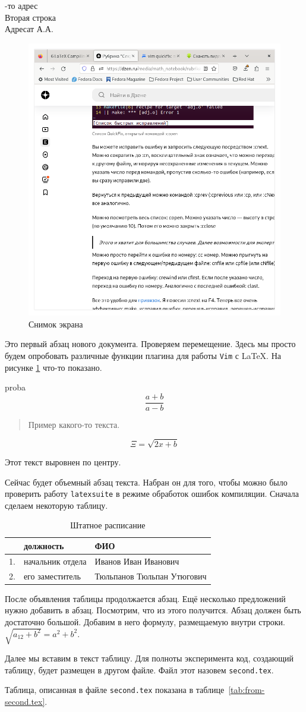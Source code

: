 \documentclass[a4paper]{article}
\begin{document}
\hfill
\parbox{75mm}{-то адрес\\Вторая строка\\[3mm]Адресат А.А.}
	
\begin{figure}[t]
	\centering
	\includegraphics[width=.7\textwidth]{screenshot-firefox.png}
	\caption{Снимок экрана}
	\label{fig:screenshot}
\end{figure}

Это первый абзац нового документа. Проверяем перемещение. Здесь мы просто будем опробовать различные функции 
плагина для работы \texttt{Vim} с \LaTeX.
На рисунке \ref{fig:screenshot} что-то показано. 

proba 
$$\frac{a+b}{a-b}$$
\begin{quote}
  Пример какого-то текста.
\end{quote}
\begin{equation}
   \Xi = \sqrt{2x+b} 
  \label{equation}
\end{equation}
\begin{center}
	Этот текст выровнен по центру.
\end{center}
Сейчас будет объемный абзац текста. Набран он для того, чтобы можно было проверить работу
\texttt{latexsuite} в режиме обработок ошибок компиляции. Сначала сделаем некоторую таблицу.
\begin{table}
	\centering
	\begin{tabular}{|c|l|p{3cm}|}
		\hline
		\textnumero&должность&ФИО\\
		\hline
		1.&начальник отдела&Иванов Иван Иванович\\
		2.&его заместитель&Тюльпанов Тюльпан Утюгович\\
		\hline
	\end{tabular}
	\caption{Штатное расписание}
	\label{tab:state-department}
\end{table}
После объявления таблицы продолжается абзац. Ещё несколько предложений нужно добавить в абзац.
Посмотрим, что из этого получится. Абзац должен быть достаточно большой. Добавим в него формулу, 
размещаемую внутри строки. $\sqrt{a_{12}+b^2} = a^2+b^2$.

Далее мы вставим в текст таблицу. Для полноты эксперимента код, создающий таблицу, будет размещен в другом файле. Файл этот назовем \texttt{second.tex}.

Таблица, описанная в файле \texttt{second.tex} показана в таблице~\ref{tab:from-second.tex}.
\end{document}

